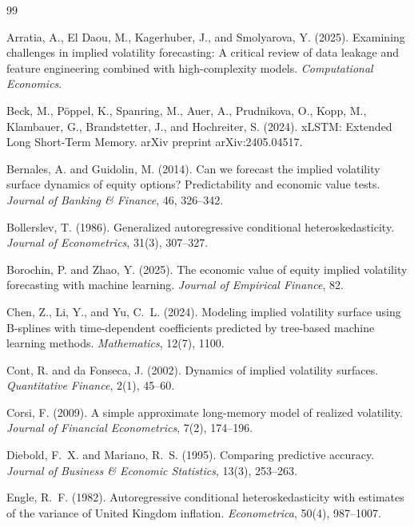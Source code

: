 \documentclass[12pt]{report}
\begin{document}
\begin{thebibliography}{99}

Arratia, A., El Daou, M., Kagerhuber, J., and Smolyarova, Y. (2025).
\newblock Examining challenges in implied volatility forecasting: A critical review of data leakage and feature engineering combined with high-complexity models.
\newblock \emph{Computational Economics}.

Beck, M., P\"oppel, K., Spanring, M., Auer, A., Prudnikova, O., Kopp, M., Klambauer, G., Brandstetter, J., and Hochreiter, S. (2024).
\newblock xLSTM: Extended Long Short-Term Memory.
\newblock arXiv preprint arXiv:2405.04517.

Bernales, A. and Guidolin, M. (2014).
\newblock Can we forecast the implied volatility surface dynamics of equity options? Predictability and economic value tests.
\newblock \emph{Journal of Banking \& Finance}, 46, 326--342.

Bollerslev, T. (1986).
\newblock Generalized autoregressive conditional heteroskedasticity.
\newblock \emph{Journal of Econometrics}, 31(3), 307--327.

Borochin, P. and Zhao, Y. (2025).
\newblock The economic value of equity implied volatility forecasting with machine learning.
\newblock \emph{Journal of Empirical Finance}, 82.

Chen, Z., Li, Y., and Yu, C.~L. (2024).
\newblock Modeling implied volatility surface using B-splines with time-dependent coefficients predicted by tree-based machine learning methods.
\newblock \emph{Mathematics}, 12(7), 1100.

Cont, R. and da Fonseca, J. (2002).
\newblock Dynamics of implied volatility surfaces.
\newblock \emph{Quantitative Finance}, 2(1), 45--60.

Corsi, F. (2009).
\newblock A simple approximate long-memory model of realized volatility.
\newblock \emph{Journal of Financial Econometrics}, 7(2), 174--196.

Diebold, F.~X. and Mariano, R.~S. (1995).
\newblock Comparing predictive accuracy.
\newblock \emph{Journal of Business \& Economic Statistics}, 13(3), 253--263.

Engle, R.~F. (1982).
\newblock Autoregressive conditional heteroskedasticity with estimates of the variance of United Kingdom inflation.
\newblock \emph{Econometrica}, 50(4), 987--1007.


\end{thebibliography}
\end{document}
